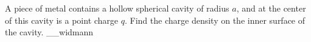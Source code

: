 A piece of metal contains a hollow spherical cavity of radius $a$, and
at the center of this cavity is a point charge $q$.  Find the charge
density on the inner surface of the cavity. 
__widmann
\answercheck

